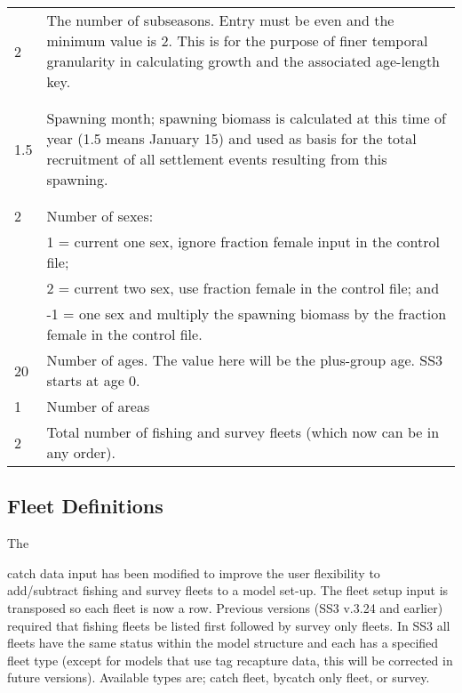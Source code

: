 \begin{center}
\begin{longtable}{p{4cm} p{12cm}}
		\hline
		2 & \multirow{1}{1cm}[-0.1cm]{\parbox{12cm}{The number of subseasons.  Entry must be even and the minimum value is 2. This is for the purpose of finer temporal granularity in calculating growth and the associated age-length key.}}\Tstrut\\
		& \\
		& \Bstrut\\
		
		\hline
		\hypertarget{RecrTiminig}{1.5} & \multirow{1}{1cm}[-0.1cm]{\parbox{12cm}{Spawning month; spawning biomass is calculated at this time of year (1.5 means January 15) and used as basis for the total recruitment of all settlement events resulting from this spawning.}}\Tstrut\\
		& \\
		& \Bstrut\\

		\hline
		2 \Tstrut & Number of sexes: \\
		 & 1 = current one sex, ignore fraction female input in the control file;\\
		 & 2 = current two sex, use fraction female in the control file; and \\
		 & -1 = one sex and multiply the spawning biomass by the fraction female in the control file. \Bstrut\\

		\hline
		20 \Tstrut & Number of ages. The value here will be the plus-group age.  SS3 starts at age 0. \\

		\hline
		1 & Number of areas \Tstrut\Bstrut\\

		\hline
		2 \Tstrut & Total number of fishing and survey fleets (which now can be in any order).\\
		\hline
	\end{longtable}
\end{center}


\subsection{Fleet Definitions }
\hypertarget{GenericFleets}{The} catch data input has been modified to improve the user flexibility to add/subtract fishing and survey fleets to a model set-up.  The fleet setup input is transposed so each fleet is now a row.  Previous versions (SS3 v.3.24 and earlier) required that fishing fleets be listed first followed by survey only fleets.  In SS3 all fleets have the same status within the model structure and each has a specified fleet type (except for models that use tag recapture data, this will be corrected in future versions).  Available types are; catch fleet, bycatch only fleet, or survey.  

